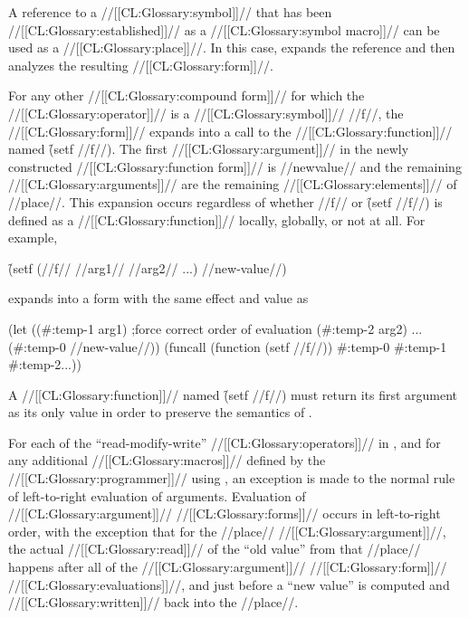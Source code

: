 A reference to a //[[CL:Glossary:symbol]]// that has been //[[CL:Glossary:established]]// as a //[[CL:Glossary:symbol macro]]//  can be used as a //[[CL:Glossary:place]]//.  In this case,  expands the reference and then analyzes the resulting //[[CL:Glossary:form]]//.

\endsubsubsection%


For any other //[[CL:Glossary:compound form]]// for which the //[[CL:Glossary:operator]]// is a //[[CL:Glossary:symbol]]// //f//, the  //[[CL:Glossary:form]]// expands into a call  to the //[[CL:Glossary:function]]// named \f{(setf //f//)}. The first //[[CL:Glossary:argument]]// in the newly constructed //[[CL:Glossary:function form]]// is //newvalue// and the
     remaining //[[CL:Glossary:arguments]]// are the remaining //[[CL:Glossary:elements]]// of
     //place//. This expansion occurs regardless of whether //f// or \f{(setf //f//)} is defined as a //[[CL:Glossary:function]]// locally, globally, or not at all. For example,

\f{(setf (//f// //arg1// //arg2// ...) //new-value//)}

expands into a form with the same effect and value as

\code
 (let ((#:temp-1 arg1)          ;force correct order of evaluation
       (#:temp-2 arg2)
       ...
       (#:temp-0 //new-value//))
   (funcall (function (setf //f//)) #:temp-0 #:temp-1 #:temp-2...)) \endcode

A //[[CL:Glossary:function]]// named \f{(setf //f//)} must return its first argument as its only value in order to preserve the semantics of .

\endsubsubsection%

\endsubSection%



For each of the ``read-modify-write'' //[[CL:Glossary:operators]]// in \thenextfigure,  and for any additional //[[CL:Glossary:macros]]//  defined by the //[[CL:Glossary:programmer]]// using , an exception is made to the normal rule of left-to-right evaluation of arguments. Evaluation of //[[CL:Glossary:argument]]// //[[CL:Glossary:forms]]// occurs in left-to-right order, with the exception that for the //place// //[[CL:Glossary:argument]]//, the actual //[[CL:Glossary:read]]// of the ``old value'' from that //place// happens  after all of the //[[CL:Glossary:argument]]// //[[CL:Glossary:form]]// //[[CL:Glossary:evaluations]]//,  and just before a ``new value'' is computed and //[[CL:Glossary:written]]// back into the //place//.

